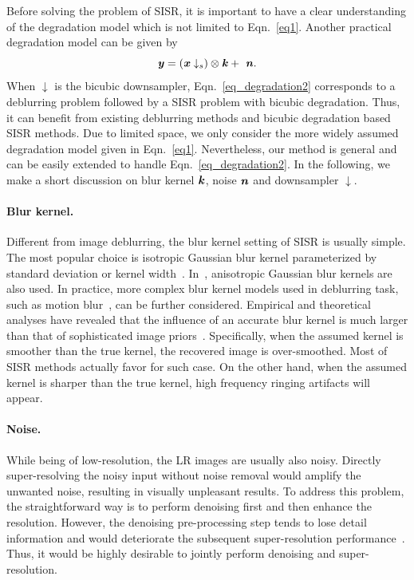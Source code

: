 \documentclass[10pt,twocolumn,letterpaper]{article}
\begin{document}
Before solving the problem of SISR, it is important to have a clear understanding of the degradation model which is not limited to Eqn.~\eqref{eq1}.
Another practical degradation model can be given by
\begin{equation}\label{eq_degradation2}
  \textbf{\emph{y}}=(\textbf{\emph{x}}\downarrow_s) \otimes \textbf{\emph{k}} + ~ \textbf{\emph{n}}.
\end{equation}
When $\downarrow$ is the bicubic downsampler,
Eqn.~\eqref{eq_degradation2} corresponds to a deblurring problem followed by a SISR problem with bicubic degradation.
Thus, it can benefit from existing deblurring methods and bicubic degradation based SISR methods.
Due to limited space, we only consider the more widely assumed degradation model given in Eqn.~\eqref{eq1}.
Nevertheless, our method is general and can be easily extended to handle Eqn.~\eqref{eq_degradation2}.
In the following, we make a short discussion on blur kernel $\textbf{\emph{k}}$, noise $\textbf{\emph{n}}$ and downsampler $\downarrow$.

\vspace{-0.35cm}
\paragraph{Blur kernel.} Different from image deblurring, the blur kernel setting of SISR is usually simple. The most popular choice is isotropic Gaussian blur kernel parameterized by standard deviation or kernel width~\cite{dong2013nonlocally,yang2014single}.
In~\cite{riegler2015conditioned}, anisotropic Gaussian blur kernels are also used.
In practice, more complex blur kernel models used in deblurring task, such as motion blur~\cite{Boracchi2012}, can be further considered.
Empirical and theoretical analyses have revealed that the influence of an accurate blur kernel is much larger than that of sophisticated image priors~\cite{efrat2013accurate}.
Specifically, when the assumed kernel is smoother than the true kernel, the recovered image is over-smoothed. Most of SISR methods actually favor for such case. On the other hand, when the assumed kernel is sharper than the true kernel, high frequency ringing artifacts will appear.

\vspace{-0.35cm}
\paragraph{Noise.} While being of low-resolution, the LR images are usually also noisy. Directly super-resolving the noisy input without noise removal would amplify the unwanted noise, resulting in visually unpleasant results. To address this problem, the straightforward way is to perform denoising first and then enhance the resolution. However, the denoising pre-processing step tends to lose detail information and would deteriorate the subsequent super-resolution performance~\cite{singh2014super}.
Thus, it would be highly desirable to jointly perform denoising and super-resolution.
\end{document}
